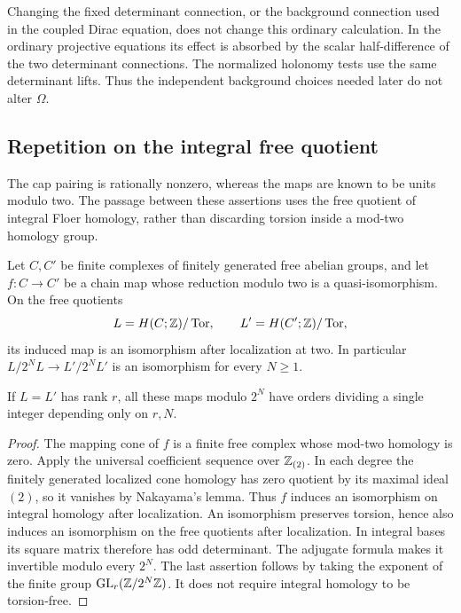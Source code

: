 Changing the fixed determinant connection, or the background connection
used in the coupled Dirac equation, does not change this ordinary
calculation.  In the ordinary projective equations its effect is
absorbed by the scalar half-difference of the two determinant
connections.  The normalized holonomy tests use the same determinant
lifts.  Thus the independent background choices needed later do not
alter \(\Omega\).

\subsection{Repetition on the integral free quotient}

The cap pairing is rationally nonzero, whereas the maps are known to
be units modulo two.  The passage between these assertions uses the
free quotient of integral Floer homology, rather than discarding
torsion inside a mod-two homology group.

\begin{lemma}
\label{lem:stack:finite-lattice}
Let \(C,C'\) be finite complexes of finitely generated free abelian
groups, and let \(f:C\to C'\) be a chain map whose reduction modulo
two is a quasi-isomorphism.  On the free quotients
\[
 L=H(C;\mathbb Z)/\operatorname{Tor},\qquad
 L'=H(C';\mathbb Z)/\operatorname{Tor},
\]
its induced map is an isomorphism after localization at two.  In
particular \(L/2^NL\to L'/2^NL'\) is an isomorphism for every
\(N\ge1\).

If \(L=L'\) has rank \(r\), all these maps modulo \(2^N\)
have orders dividing a single integer depending only on \(r,N\).
\end{lemma}

\begin{proof}
The mapping cone of \(f\) is a finite free complex whose mod-two
homology is zero.  Apply the universal coefficient sequence over
\(\mathbb Z_{(2)}\).  In each degree the finitely generated localized
cone homology has zero quotient by its maximal ideal \((2)\),
so it vanishes by Nakayama's lemma.  Thus \(f\) induces an
isomorphism on integral homology after localization.  An isomorphism
preserves torsion, hence also induces an isomorphism on the free
quotients after localization.  In integral bases its square matrix
therefore has odd determinant.  The adjugate formula makes it
invertible modulo every \(2^N\).  The last assertion follows by
taking the exponent of the finite group
\(\operatorname{GL}_r(\mathbb Z/2^N\mathbb Z)\).  It does not require integral homology to
be torsion-free.
\end{proof}

